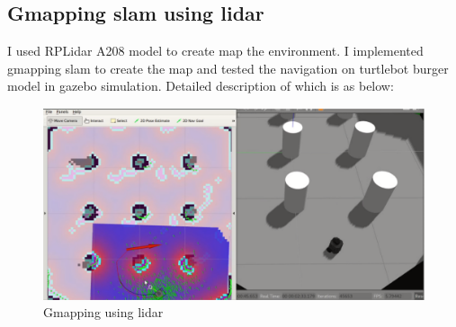 \subsection{Gmapping slam using lidar}
I used RPLidar A208 model to create map the environment. I implemented gmapping slam to create the map and tested the navigation on turtlebot burger model in gazebo simulation. Detailed description of which is as below:\cite{ustintern}
\newline \begin{figure}[H]
    \centering
    \includegraphics[width=1.0\textwidth]{images/gmapping.png}
    \caption{Gmapping using lidar}
\end{figure}
